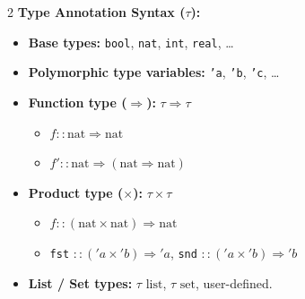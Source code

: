 \documentclass[10pt,a4paper]{article}
\begin{document}
\begin{tcolorbox}[title=2. Types \& Terms in Isabelle]
\begin{multicols}{2}
\textbf{Type Annotation Syntax ($\tau$):}
\begin{itemize}[leftmargin=1.2em, itemsep=3pt]
    \item \textbf{Base types:} \texttt{bool}, \texttt{nat}, \texttt{int}, \texttt{real}, \dots
    \item \textbf{Polymorphic type variables:} \texttt{'a}, \texttt{'b}, \texttt{'c}, \dots
    \item \textbf{Function type ($\Rightarrow$):} $\tau \Rightarrow \tau$
    \begin{itemize}[leftmargin=1em, label=$\rightarrow$]
        \item $f :: \text{nat} \Rightarrow \text{nat}$
        \item $f' :: \text{nat} \Rightarrow (\text{nat} \Rightarrow \text{nat})$
    \end{itemize}
    \item \textbf{Product type ($\times$):} $\tau \times \tau$
    \begin{itemize}[leftmargin=1em, label=$\rightarrow$]
        \item $f :: (\text{nat} \times \text{nat}) \Rightarrow \text{nat}$
        \item \texttt{fst} $:: ('a \times 'b) \Rightarrow 'a$, \quad \texttt{snd} $:: ('a \times 'b) \Rightarrow 'b$
    \end{itemize}
    \item \textbf{List / Set types:} $\tau \text{ list}$, $\tau \text{ set}$, user-defined.
\end{itemize}
\end{multicols}
\end{tcolorbox}

\vspace{0.3em}
\end{document}
